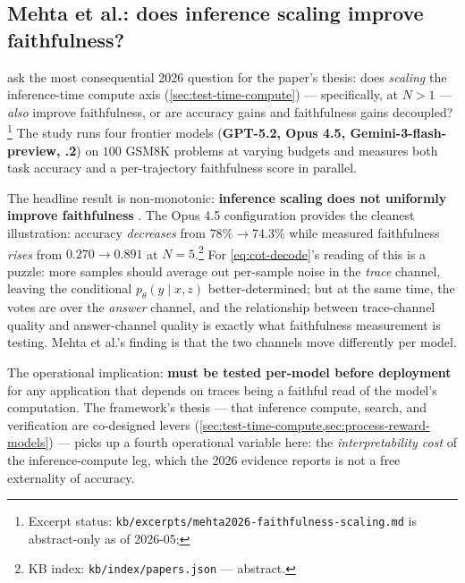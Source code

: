 \subsection{Mehta et al.: does inference scaling improve faithfulness?}
\label{sec:faith-mehta}

\citet{mehta2026-faithfulness-scaling} ask the most consequential 2026
question for the paper's thesis: does \emph{scaling} the inference-time
compute axis (\cref{sec:test-time-compute}) — specifically,
 at $N > 1$ — \emph{also} improve faithfulness, or are
accuracy gains and faithfulness gains decoupled?%
\footnote{Excerpt status:
\texttt{kb/excerpts/mehta2026-faithfulness-scaling.md} is abstract-only
as of 2026-05; } The study runs four frontier models
(\textbf{GPT-5.2,  Opus 4.5, Gemini-3-flash-preview,
.2}) on $100$ GSM8K problems at varying 
budgets and measures both task accuracy and a per-trajectory
faithfulness score in parallel.

The headline result is non-monotonic: \textbf{inference scaling does
not uniformly improve faithfulness}
\citep[abstract]{mehta2026-faithfulness-scaling}. The  Opus 4.5
configuration provides the cleanest illustration: accuracy
\emph{decreases} from $78\% \to 74.3\%$ while measured faithfulness
\emph{rises} from $0.270 \to 0.891$ at
$N = 5$.\footnote{KB index:
\texttt{kb/index/papers.json} — abstract.
}
For \cref{eq:cot-decode}'s reading of  this is a
puzzle: more samples should average out per-sample noise in the
\emph{trace} channel, leaving the conditional $p_\theta(y \mid x, z)$
better-determined; but at the same time, the votes are over the
\emph{answer} channel, and the relationship between trace-channel
quality and answer-channel quality is exactly what faithfulness
measurement is testing. Mehta et al.'s finding is that the two channels
move differently per model.

The operational implication: \textbf{ must be tested
per-model before deployment}
\citep[abstract]{mehta2026-faithfulness-scaling} for any application
that depends on traces being a faithful read of the model's
computation. The framework's thesis — that inference compute, search,
and verification are co-designed levers (\cref{sec:test-time-compute,sec:process-reward-models})
— picks up a fourth operational variable here: the
\emph{interpretability cost} of the inference-compute leg, which the
2026 evidence reports is not a free externality of accuracy.

